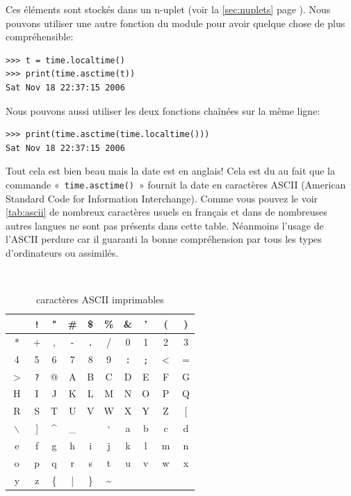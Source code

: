 Ces éléments sont stockés dans un n-uplet (voir la \autoref{sec:nuplets} page \pageref{sec:nuplets}). Nous pouvons utiliser une autre fonction du module pour avoir quelque chose de plus compréhensible:

\begin{Verbatim}[frame=single,rulecolor=\color{mbleu}, label=à taper]
>>> t = time.localtime()
>>> print(time.asctime(t))
Sat Nov 18 22:37:15 2006
\end{Verbatim}

Nous pouvons aussi utiliser les deux fonctions chaînées sur la même ligne:

\begin{Verbatim}[frame=single,rulecolor=\color{mbleu}, label=à taper]
>>> print(time.asctime(time.localtime()))
Sat Nov 18 22:37:15 2006
\end{Verbatim}

Tout cela est bien beau mais la date est en anglais! Cela est du au fait que la commande «~\texttt{time.asctime()}~» fournit la date en caractères ASCII (American Standard Code for Information Interchange). Comme vous pouvez le voir \autoref{tab:ascii} de nombreux caractères usuels en français et dans de nombreuses autres langues ne sont pas présents dans cette table. Néanmoins l'usage de l'ASCII perdure car il guaranti la bonne compréhension par tous les types d'ordinateurs ou assimilés.

\begin{table}[h!]
\tt
\centering
\begin{tabular}{|c|c|c|c|c|c|c|c|c|c|}
\hline 
\verb*+ + & \verb+!+ & " & \# & \$ & \% & \& & ' & ( & ) \\ 
\hline
* & + & , & - & \verb+.+ & / & 0 & 1 & 2 & 3 \\ 
\hline
4 & 5 & 6 & 7 & 8 & 9 & \verb+:+ & \verb+;+ & $<$ & = \\ 
\hline
$>$ & \verb+?+ & @ & A & B & C & D & E & F & G \\ 
\hline
H & I & J & K & L & M & N & O & P & Q \\ 
\hline
R & S & T & U & V & W & X & Y & Z & [ \\ 
\hline
$\backslash$ & ] & \textasciicircum & \_ &  & ` & a & b & c & d \\ 
\hline
e & f & g & h & i & j & k & l & m & n \\ 
\hline
o & p & q & r & s & t & u & v & w & x \\ 
\hline
y & z & \{ & | & \} & \textasciitilde &  &  &  &  \\ 
\hline
\end{tabular}
\rm
\caption{caractères ASCII imprimables} \label{tab:ascii}
\end{table}

